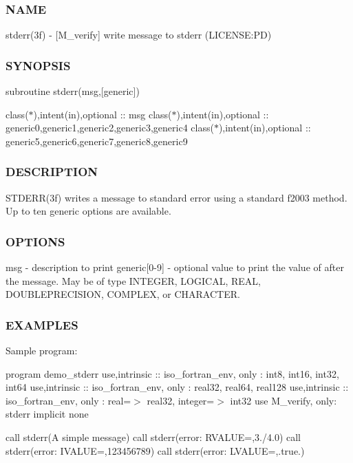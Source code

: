 \subsubsection*{N\+A\+ME}

stderr(3f) -\/ \mbox{[}M\+\_\+verify\mbox{]} write message to stderr (L\+I\+C\+E\+N\+SE\+:PD) \subsubsection*{S\+Y\+N\+O\+P\+S\+IS}

subroutine stderr(msg,\mbox{[}generic\mbox{]})

class($\ast$),intent(in),optional \+:\+: msg class($\ast$),intent(in),optional \+:\+: generic0,generic1,generic2,generic3,generic4 class($\ast$),intent(in),optional \+:\+: generic5,generic6,generic7,generic8,generic9 \subsubsection*{D\+E\+S\+C\+R\+I\+P\+T\+I\+ON}

S\+T\+D\+E\+R\+R(3f) writes a message to standard error using a standard f2003 method. Up to ten generic options are available. \subsubsection*{O\+P\+T\+I\+O\+NS}

msg -\/ description to print generic\mbox{[}0-\/9\mbox{]} -\/ optional value to print the value of after the message. May be of type I\+N\+T\+E\+G\+ER, L\+O\+G\+I\+C\+AL, R\+E\+AL, D\+O\+U\+B\+L\+E\+P\+R\+E\+C\+I\+S\+I\+ON, C\+O\+M\+P\+L\+EX, or C\+H\+A\+R\+A\+C\+T\+ER. \subsubsection*{E\+X\+A\+M\+P\+L\+ES}

Sample program\+:

program demo\+\_\+stderr use,intrinsic \+:\+: iso\+\_\+fortran\+\_\+env, only \+: int8, int16, int32, int64 use,intrinsic \+:\+: iso\+\_\+fortran\+\_\+env, only \+: real32, real64, real128 use,intrinsic \+:\+: iso\+\_\+fortran\+\_\+env, only \+: real=$>$ real32, integer=$>$ int32 use M\+\_\+verify, only\+: stderr implicit none

call stderr(\textquotesingle{}A simple message\textquotesingle{}) call stderr(\textquotesingle{}error\+: R\+V\+A\+L\+UE=\textquotesingle{},3./4.0) call stderr(\textquotesingle{}error\+: I\+V\+A\+L\+UE=\textquotesingle{},123456789) call stderr(\textquotesingle{}error\+: L\+V\+A\+L\+UE=\textquotesingle{},.true.)

